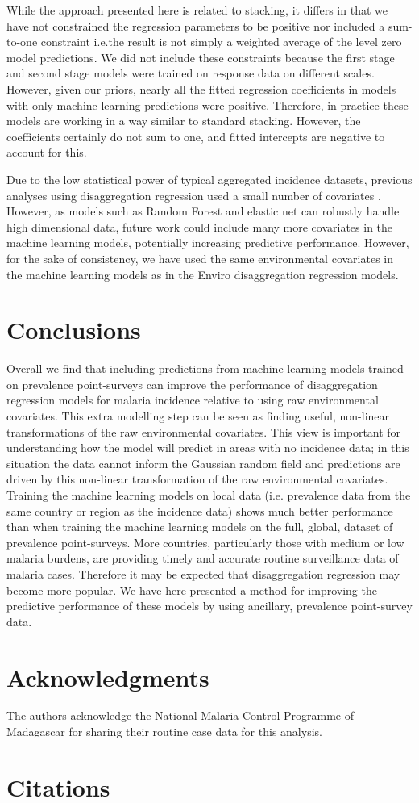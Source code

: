 \documentclass[review]{elsarticle}
\begin{document}
While the approach presented here is related to stacking, it differs in that we have not constrained the regression parameters to be positive nor included a sum-to-one constraint i.e.\thinspace the result is not simply a weighted average of the level zero model predictions.
We did not include these constraints because the first stage and second stage models were trained on response data on different scales.
However, given our priors, nearly all the fitted regression coefficients in models with only machine learning predictions were positive.
Therefore, in practice these models are working in a way similar to standard stacking.
However, the coefficients certainly do not sum to one, and fitted intercepts are negative to account for this.


Due to the low statistical power of typical aggregated incidence datasets, previous analyses using disaggregation regression used a small number of covariates \citep{sturrock2014fine}.
However, as models such as Random Forest and elastic net can robustly handle high dimensional data, future work could include many more covariates in the machine learning models, potentially increasing predictive performance.
However, for the sake of consistency, we have used the same environmental covariates in the machine learning models as in the Enviro disaggregation regression models.



\section{Conclusions}

Overall we find that including predictions from machine learning models trained on prevalence point-surveys can improve the performance of disaggregation regression models for malaria incidence relative to using raw environmental covariates.
This extra modelling step can be seen as finding useful, non-linear transformations of the raw environmental covariates.
This view is important for understanding how the model will predict in areas with no incidence data; in this situation the data cannot inform the Gaussian random field and predictions are driven by this non-linear transformation of the raw environmental covariates.
Training the machine learning models on local data (i.e. prevalence data from the same country or region as the incidence data) shows much better performance than when training the machine learning models on the full, global, dataset of prevalence point-surveys.
More countries, particularly those with medium or low malaria burdens, are providing timely and accurate routine surveillance data of malaria cases.
Therefore it may be expected that disaggregation regression may become more popular.
We have here presented a method for improving the predictive performance of these models by using ancillary, prevalence point-survey data.



\section*{Acknowledgments}
The authors acknowledge the National Malaria Control Programme of Madagascar for sharing their routine case data for this analysis.

\section*{Citations}
 
%
%
\end{document}
